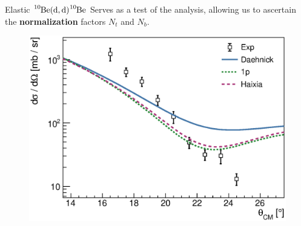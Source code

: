 \documentclass[sans,
frameno, %
mp,
usenames,dvipsnames, %
onlytextwidth, %
t,%
11pt]{beamer}
\newcommand{\iso}[2]{\ce{^{#1}#2}}
\begin{document}
\begin{frame}{Elastic $\iso{10}{Be}(\textrm{d}, \textrm{d})\iso{10}{Be}$}
    Serves as a test of the analysis, allowing us to ascertain the \textbf{normalization} factors $N_t$ and $N_b$.
    \begin{figure}
        \begin{minipage}[t]{0.48\linewidth}
            \centering
        \end{minipage}
        \hfill
        \begin{minipage}[t]{0.48\linewidth}
            \centering
            \includegraphics[width=\textwidth]{figures/Workshop/10Be_dd_xs.eps}

\end{minipage}
\end{figure}
\end{frame}
\end{document}
